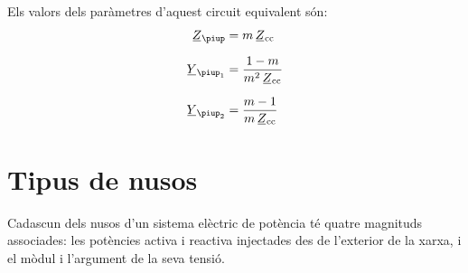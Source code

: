 \begin{center}
    
    \label{pic:equiv_trafo_reg}
\end{center}

Els valors dels paràmetres d'aquest circuit equivalent són:
\begin{align}
   \cmplx{Z}_\piup &= m \, \cmplx{Z}\ped{cc} \\[1.5ex]
   \cmplx{Y}_{\piup_1} &= \frac{1-m}{m^2 \,\cmplx{Z}\ped{cc}} \\[1.5ex]
   \cmplx{Y}_{\piup_2} &= \frac{m-1}{m\, \cmplx{Z}\ped{cc}}
\end{align}

\section{Tipus de nusos} 

Cadascun dels nusos d'un sistema elèctric de potència té quatre
magnituds associades: les potències activa i reactiva injectades des
de l'exterior de la xarxa, i el mòdul i l'argument de la seva
tensió.

